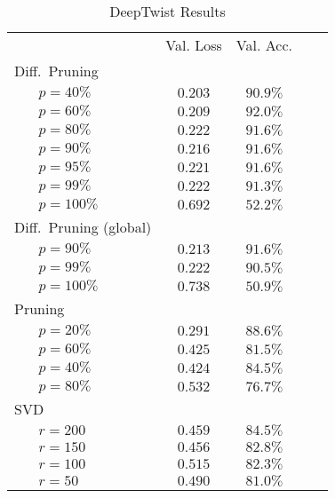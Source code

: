 \newlength{\tableblocksep}
\setlength{\tableblocksep}{1ex}

\begin{table}[tbh]
        \caption{DeepTwist Results}
        \label{tab:deeptwistresults}
        \centering
        \vspace{1em}
        \begin{tabular}{p{1ex}lcccc}
\toprule
& &       Val. Loss & Val. Acc. \\
\cmidrule{3-4}
\multicolumn{2}{l}{Diff.\ Pruning} \\
& $p=40\%$  & $0.203$ & $90.9\%$ \\
& $p=60\%$  & $0.209$ & $92.0\%$ \\
& $p=80\%$  & $0.222$ & $91.6\%$ \\
& $p=90\%$  & $0.216$ & $91.6\%$ \\
& $p=95\%$  & $0.221$ & $91.6\%$ \\
& $p=99\%$  & $0.222$ & $91.3\%$ \\
& $p=100\%$ & $0.692$ & $52.2\%$ \\[\tableblocksep]
\multicolumn{2}{l}{Diff.\ Pruning (global)} \\
& $p=90\%$  & $0.213$ & $91.6\%$ \\
& $p=99\%$  & $0.222$ & $90.5\%$ \\
& $p=100\%$ & $0.738$ & $50.9\%$ \\[\tableblocksep]
\multicolumn{2}{l}{Pruning} \\
& $p=20\%$  & $0.291$ & $88.6\%$ \\
& $p=60\%$  & $0.425$ & $81.5\%$ \\
& $p=40\%$  & $0.424$ & $84.5\%$ \\
& $p=80\%$  & $0.532$ & $76.7\%$ \\[\tableblocksep]
\multicolumn{2}{l}{SVD} \\
& $r=200$   & $0.459$ & $84.5\%$ \\
& $r=150$   & $0.456$ & $82.8\%$ \\
& $r=100$   & $0.515$ & $82.3\%$ \\
& $r=50$    & $0.490$ & $81.0\%$ \\[\tableblocksep]
\bottomrule
\end{tabular}

        \end{table}
